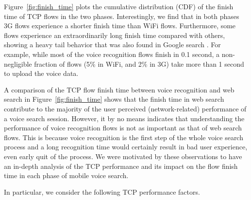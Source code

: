 Figure~\ref{fig:finish_time} plots the cumulative distribution (CDF) of the finish time of TCP flows in the two phases. Interestingly, we find that in both phases 3G flows experience a shorter finish time than WiFi flows. Furthermore, some flows experience an extraordinarily long finish time compared with others, showing a heavy tail behavior that was also found in Google search \cite{flach2013reducing}. For example, while most of the voice recognition flows finish in 0.1 second, a non-negligible fraction of flows (5\% in WiFi, and 2\% in 3G) take more than 1 second to upload the voice data. 


A comparison of the TCP flow finish time between voice recognition and web search in Figure~\ref{fig:finish_time} shows that the finish time in web search contribute to the majority of the user perceived (network-related) performance of a voice search session. However, it by no means indicates that understanding the performance of voice recognition flows is not as important as that of web search flows. This is because voice recognition is the first step of the whole voice search process and a long recognition time would certainly result in bad user experience, even early quit of the process. We were motivated by these observations to have an in-depth analysis of the TCP performance and its impact on the flow finish time in each phase of mobile voice search.



In particular, we consider the following TCP performance factors. 

